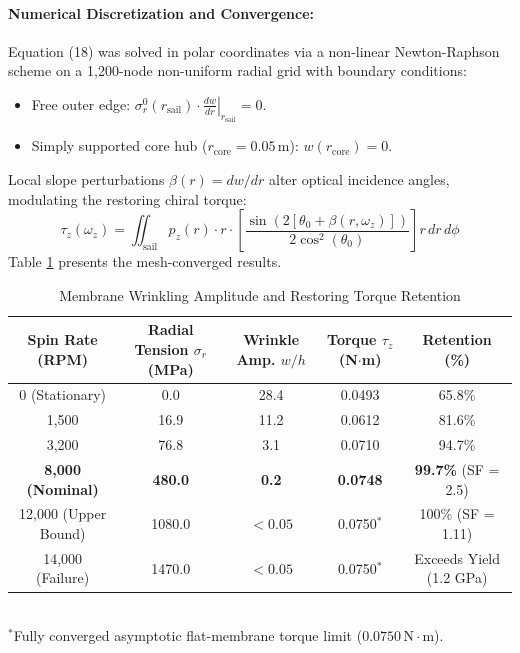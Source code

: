 \documentclass[11pt, a4paper]{article}
\begin{document}
\paragraph{Numerical Discretization and Convergence:} 
Equation (18) was solved in polar coordinates via a non-linear Newton-Raphson scheme on a 1,200-node non-uniform radial grid with boundary conditions:
\begin{itemize}
    \item Free outer edge: $\sigma_r^0(r_{\mathrm{sail}}) \cdot \left.\frac{dw}{dr}\right|_{r_{\mathrm{sail}}} = 0$.
    \item Simply supported core hub ($r_{\mathrm{core}} = 0.05\,\text{m}$): $w(r_{\mathrm{core}}) = 0$.
\end{itemize}
Local slope perturbations $\beta(r) = dw/dr$ alter optical incidence angles, modulating the restoring chiral torque:
\begin{equation}
    \tau_z(\omega_z) = \iint_{\mathrm{sail}} p_z(r) \cdot r \cdot \left[ \frac{\sin\left(2\left[\theta_0 + \beta(r,\omega_z)\right]\right)}{2 \cos^2(\theta_0)} \right] r \, dr \, d\phi
\end{equation}
Table \ref{tab:wrinkle_torque} presents the mesh-converged results.

\begin{table}[h]
\centering
\small
\setlength{\tabcolsep}{4.5pt}
\caption{Membrane Wrinkling Amplitude and Restoring Torque Retention}
\label{tab:wrinkle_torque}
\vspace{2mm}
\begin{tabular}{ccccc}
\toprule
\textbf{Spin Rate (RPM)} & \textbf{Radial Tension $\sigma_r$ (MPa)} & \textbf{Wrinkle Amp. $w/h$} & \textbf{Torque $\tau_z$ (N$\cdot$m)} & \textbf{Retention (\%)} \\
\midrule
0 (Stationary) & 0.0 & 28.4 & 0.0493 & 65.8\% \\
1,500 & 16.9 & 11.2 & 0.0612 & 81.6\% \\
3,200 & 76.8 & 3.1 & 0.0710 & 94.7\% \\
\textbf{8,000 (Nominal)} & \textbf{480.0} & \textbf{0.2} & \textbf{0.0748} & \textbf{99.7\%} (SF = 2.5) \\
12,000 (Upper Bound) & 1080.0 & $< 0.05$ & 0.0750$^*$ & 100\% (SF = 1.11) \\
14,000 (Failure) & 1470.0 & $< 0.05$ & 0.0750$^*$ & Exceeds Yield (1.2 GPa) \\
\bottomrule
\end{tabular}
\vspace{1mm}\\
\footnotesize{$^*$Fully converged asymptotic flat-membrane torque limit ($0.0750\,\text{N}\cdot\text{m}$).}
\end{table}
\end{document}
